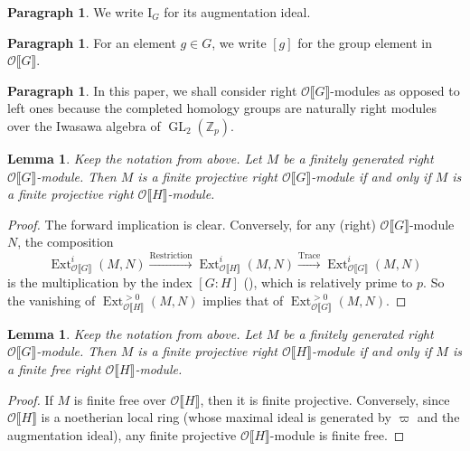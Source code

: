 \documentclass[12pt]{amsart}
\newtheorem{lemma}[subsection]{Lemma}
\theoremstyle{definition}
\newtheorem{para}[subsection]{Paragraph}
\numberwithin{equation}{subsection}
\def\calO{\mathcal{O}}
\def\ZZ{\mathbb{Z}}
\def\rmI{\mathrm{I}}
\DeclareMathOperator{\Ext}{Ext}
\DeclareMathOperator{\GL}{GL}
\begin{document}
\begin{para}
\label{P:para_053}
We write $\rmI_G$ for its augmentation ideal.
\end{para}

\begin{para}
\label{P:para_054}
For an element $g \in G$, we write $[g]$ for the group element in $\calO\llbracket G \rrbracket$.
\end{para}


\begin{para}
\label{P:para_055}
In this paper, we shall consider right $\calO\llbracket G\rrbracket$-modules as opposed to  left ones because the completed homology groups are naturally right modules over the Iwasawa algebra of $\GL_2(\ZZ_p)$. 
\end{para}

\begin{lemma}
\label{L:Iwasawa algebra properties_part1}
Keep the notation from above. Let $M$ be a finitely generated \emph{right} $\calO\llbracket G\rrbracket$-module.
Then $M$ is a finite projective right $\calO\llbracket G\rrbracket$-module if and only if $M$ is a finite projective right $\calO\llbracket H \rrbracket$-module.
\end{lemma}
\begin{proof}
The forward implication is clear. Conversely, for any (right) $\calO\llbracket G\rrbracket$-module $N$, the composition
\[
\Ext^i_{\calO\llbracket G\rrbracket}(M, N) \xrightarrow{\mathrm{Restriction}}
\Ext^i_{\calO\llbracket H\rrbracket}(M, N)
\xrightarrow{\mathrm{Trace}}
\Ext^i_{\calO\llbracket G\rrbracket}(M, N)
\]
is the multiplication by the index $[G:H]$ (\cite[Chapter I, \S~2.4]{Serre-Galois cohomology}), which is relatively prime to $p$. So the vanishing of $\Ext^{>0}_{\calO\llbracket H\rrbracket}(M, N)$ implies that of $\Ext^{>0}_{\calO\llbracket G\rrbracket}(M, N)$.
\end{proof}

\begin{lemma}
\label{L:Iwasawa algebra properties_part2}
Keep the notation from above. Let $M$ be a finitely generated \emph{right} $\calO\llbracket G\rrbracket$-module.
Then $M$ is a finite projective right $\calO\llbracket H \rrbracket$-module if and only if $M$ is a finite free right $\calO\llbracket H\rrbracket$-module.
\end{lemma}
\begin{proof}
If $M$ is finite free over $\calO\llbracket H\rrbracket$, then it is finite projective. Conversely, since $\calO\llbracket H\rrbracket$ is a noetherian local ring (whose maximal ideal is generated by $\varpi$ and the augmentation ideal), any finite projective $\calO\llbracket H\rrbracket$-module is finite free.
\end{proof}
\end{document}
